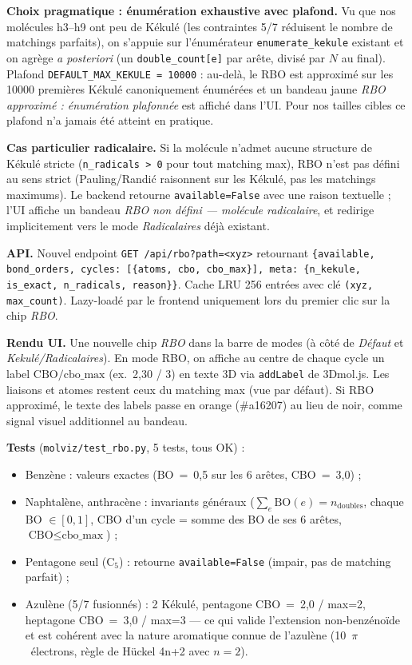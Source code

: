 \textbf{Choix pragmatique : énumération exhaustive avec plafond.} Vu
que nos molécules h3--h9 ont peu de Kékulé (les contraintes 5/7
réduisent le nombre de matchings parfaits), on s'appuie sur
l'énumérateur \texttt{enumerate\_kekule} existant et on agrège
\emph{a posteriori} (un \texttt{double\_count[e]} par arête, divisé
par $N$ au final). Plafond \texttt{DEFAULT\_MAX\_KEKULE = 10000} : au-delà,
le RBO est approximé sur les 10000 premières Kékulé canoniquement
énumérées et un bandeau jaune \emph{RBO approximé : énumération
plafonnée} est affiché dans l'UI. Pour nos tailles cibles ce plafond
n'a jamais été atteint en pratique.

\textbf{Cas particulier radicalaire.} Si la molécule n'admet aucune
structure de Kékulé stricte (\texttt{n\_radicals > 0} pour tout
matching max), RBO n'est pas défini au sens strict
(Pauling/Randić raisonnent sur les Kékulé, pas les matchings
maximums). Le backend retourne \texttt{available=False} avec une
raison textuelle ; l'UI affiche un bandeau \emph{RBO non défini ---
molécule radicalaire}, et redirige implicitement vers le mode
\emph{Radicalaires} déjà existant.

\textbf{API.} Nouvel endpoint
\texttt{GET /api/rbo?path=<xyz>} retournant
\texttt{\{available, bond\_orders, cycles: [\{atoms, cbo, cbo\_max\}], meta: \{n\_kekule, is\_exact, n\_radicals, reason\}\}}.
Cache LRU 256 entrées avec clé \texttt{(xyz, max\_count)}. Lazy-loadé
par le frontend uniquement lors du premier clic sur la chip \emph{RBO}.

\textbf{Rendu UI.} Une nouvelle chip \emph{RBO} dans la barre de
modes (à côté de \emph{Défaut} et \emph{Kekulé/Radicalaires}). En mode
RBO, on affiche au centre de chaque cycle un label
\og{}$\text{CBO} / \text{cbo\_max}$\fg{} (ex.~\og{}2{,}30 / 3\fg{})
en texte 3D via \texttt{addLabel} de 3Dmol.js. Les liaisons et atomes
restent ceux du matching max (vue par défaut). Si RBO approximé, le
texte des labels passe en orange (\#a16207) au lieu de noir, comme
signal visuel additionnel au bandeau.

\textbf{Tests} (\texttt{molviz/test\_rbo.py}, 5 tests, tous OK) :
\begin{itemize}
  \item Benzène : valeurs exactes (BO~=~0{,}5 sur les 6 arêtes,
    CBO~=~3{,}0) ;
  \item Naphtalène, anthracène : invariants généraux
    ($\sum_e \text{BO}(e) = n_{\text{doubles}}$, chaque BO $\in [0,1]$,
    CBO d'un cycle = somme des BO de ses 6 arêtes, $\text{CBO} \leq \text{cbo\_max}$) ;
  \item Pentagone seul (C$_5$) : retourne \texttt{available=False}
    (impair, pas de matching parfait) ;
  \item Azulène (5/7 fusionnés) : 2 Kékulé, pentagone CBO~=~2{,}0 / max=2,
    heptagone CBO~=~3{,}0 / max=3 --- ce qui valide l'extension non-benzénoïde
    et est cohérent avec la nature aromatique connue de l'azulène
    (10~$\pi$~électrons, règle de Hückel 4n+2 avec $n=2$).
\end{itemize}

